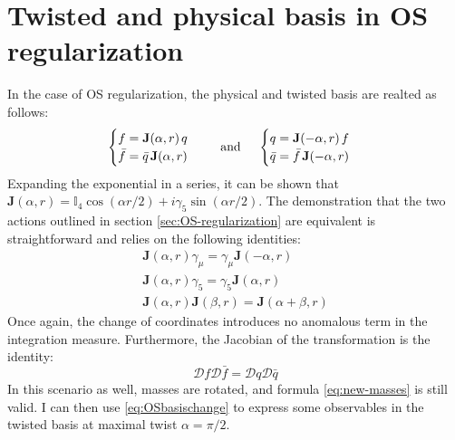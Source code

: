 \documentclass[english, LaM, oneside, noexaminfo]{sapthesis}
\begin{document}
\section{Twisted and physical basis in OS regularization}
\noindent
In the case of OS regularization, the physical and twisted basis are realted as follows:
\begin{equation*}\label{eq:OSbasischange}
    \begin{cases}
        f =  \mathbf{J}(\alpha, r)\hspace*{.5mm} q \\
        \bar f = \bar q \hspace*{.5mm} \mathbf{J}(\alpha, r)
    \end{cases}
    \quad \text{ and } \quad
    \begin{cases}
        q =  \mathbf{J}(-\alpha, r)\hspace*{.5mm} f \\
        \bar q = \bar f \hspace*{.5mm} \mathbf{J}(-\alpha, r)
    \end{cases}
\end{equation*}
Expanding the exponential in a series, it can be shown that $\mathbf{J} (\alpha, r) = \mathbb{I}_4 \cos (\alpha r/2) + i \gamma_5 \sin (\alpha r/2)$.
The demonstration that the two actions outlined in section \ref{sec:OS-regularization} are equivalent is straightforward and relies on the following identities:
\begin{equation*}
    \begin{gathered}
        \mathbf{J}(\alpha,r) \gamma_\mu = \gamma_\mu \mathbf{J}(-\alpha,r) \\
        \mathbf{J}(\alpha,r) \gamma_5 = \gamma_5 \mathbf{J}(\alpha,r) \\
        \mathbf{J}(\alpha,r) \mathbf{J}(\beta,r) = \mathbf{J}(\alpha+\beta,r) 
    \end{gathered}
\end{equation*}
Once again, the change of coordinates introduces no anomalous term in the integration measure.
Furthermore, the Jacobian of the transformation is the identity:
\begin{equation*}
    \mathcal{D} f \mathcal{D} \bar f = \mathcal{D} q \mathcal{D} \bar q
\end{equation*}
In this scenario as well, masses are rotated, and formula \ref{eq:new-masses} is still valid.
I can then use \ref{eq:OSbasischange} to express some observables in the twisted basis at maximal twist $\alpha = \pi/2$.
\end{document}

